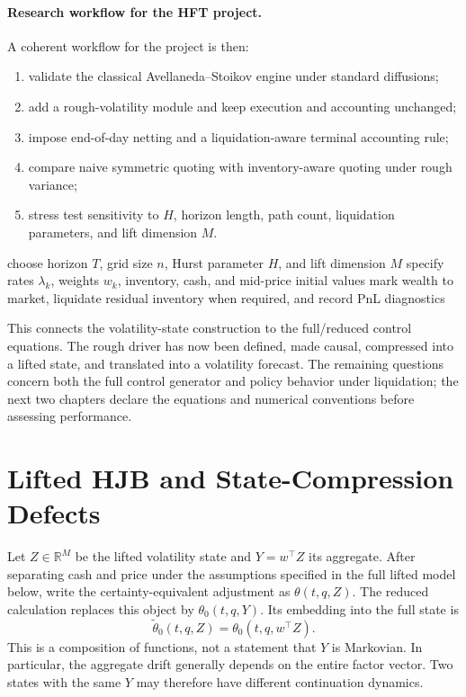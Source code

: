 \paragraph{Research workflow for the HFT project.}

A coherent workflow for the project is then:
\begin{enumerate}[label=\arabic*.]
    \item validate the classical Avellaneda--Stoikov engine under standard diffusions;
    \item add a rough-volatility module and keep execution and accounting unchanged;
    \item impose end-of-day netting and a liquidation-aware terminal accounting rule;
    \item compare naive symmetric quoting with inventory-aware quoting under rough variance;
    \item stress test sensitivity to \(H\), horizon length, path count, liquidation parameters, and lift dimension \(M\).
\end{enumerate}

\begin{algorithm}[H]
\small
\caption{From rough driver to market-making simulation}
\DontPrintSemicolon
choose horizon \(T\), grid size \(n\), Hurst parameter \(H\), and lift dimension \(M\)\;
specify rates \(\lambda_k\), weights \(w_k\), inventory, cash, and mid-price initial values\;
mark wealth to market, liquidate residual inventory when required, and record PnL diagnostics\;
\end{algorithm}

This connects the volatility-state construction to the full/reduced control equations. The rough driver has now been defined, made causal, compressed into a lifted state, and translated into a volatility forecast. The remaining questions concern both the full control generator and policy behavior under liquidation; the next two chapters declare the equations and numerical conventions before assessing performance.
\section{Lifted HJB and State-Compression Defects}


Let $Z\in\mathbb R^M$ be the lifted volatility state and $Y=w^\top Z$ its aggregate. After separating cash and price under the assumptions specified in the full lifted model below, write the certainty-equivalent adjustment as $\theta(t,q,Z)$. The reduced calculation replaces this object by $\theta_0(t,q,Y)$. Its embedding into the full state is
\[
 \widetilde\theta_0(t,q,Z)=\theta_0(t,q,w^\top Z).
\]
This is a composition of functions, not a statement that $Y$ is Markovian. In particular, the aggregate drift generally depends on the entire factor vector. Two states with the same $Y$ may therefore have different continuation dynamics.

